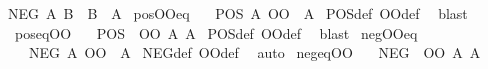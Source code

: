 \begin{isabellebody}
{\isachardoublequoteopen}NEG\ A\ B\ {\isasymequiv}\ B\ {\isasymle}\ A{\isachardoublequoteclose}\isanewline
\isanewline
{}\isamarkupfalse%
\ pos{\isacharunderscore}{\kern0pt}OO{\isacharunderscore}{\kern0pt}eq{\isacharcolon}{\kern0pt}\isanewline
\ \ \ {\isachardoublequoteopen}POS\ {\isacharparenleft}{\kern0pt}A\ OO\ {\isacharparenleft}{\kern0pt}{\isacharequal}{\kern0pt}{\isacharparenright}{\kern0pt}{\isacharparenright}{\kern0pt}\ A{\isachardoublequoteclose}\isanewline
%
\isadelimproof
%
\endisadelimproof
%
\isatagproof
{}\isamarkupfalse%
\ POS{\isacharunderscore}{\kern0pt}def\ OO{\isacharunderscore}{\kern0pt}def\ \isamarkupfalse%
\ blast%
\endisatagproof
{\isafoldproof}%
%
\isadelimproof
\isanewline
%
\endisadelimproof
\isanewline
{}\isamarkupfalse%
\ pos{\isacharunderscore}{\kern0pt}eq{\isacharunderscore}{\kern0pt}OO{\isacharcolon}{\kern0pt}\isanewline
\ \ \ {\isachardoublequoteopen}POS\ {\isacharparenleft}{\kern0pt}{\isacharparenleft}{\kern0pt}{\isacharequal}{\kern0pt}{\isacharparenright}{\kern0pt}\ OO\ A{\isacharparenright}{\kern0pt}\ A{\isachardoublequoteclose}\isanewline
%
\isadelimproof
%
\endisadelimproof
%
\isatagproof
{}\isamarkupfalse%
\ POS{\isacharunderscore}{\kern0pt}def\ OO{\isacharunderscore}{\kern0pt}def\ \isamarkupfalse%
\ blast%
\endisatagproof
{\isafoldproof}%
%
\isadelimproof
\isanewline
%
\endisadelimproof
\isanewline
{}\isamarkupfalse%
\ neg{\isacharunderscore}{\kern0pt}OO{\isacharunderscore}{\kern0pt}eq{\isacharcolon}{\kern0pt}\isanewline
\ \ \ {\isachardoublequoteopen}NEG\ {\isacharparenleft}{\kern0pt}A\ OO\ {\isacharparenleft}{\kern0pt}{\isacharequal}{\kern0pt}{\isacharparenright}{\kern0pt}{\isacharparenright}{\kern0pt}\ A{\isachardoublequoteclose}\isanewline
%
\isadelimproof
%
\endisadelimproof
%
\isatagproof
{}\isamarkupfalse%
\ NEG{\isacharunderscore}{\kern0pt}def\ OO{\isacharunderscore}{\kern0pt}def\ \isamarkupfalse%
\ auto%
\endisatagproof
{\isafoldproof}%
%
\isadelimproof
\isanewline
%
\endisadelimproof
\isanewline
{}\isamarkupfalse%
\ neg{\isacharunderscore}{\kern0pt}eq{\isacharunderscore}{\kern0pt}OO{\isacharcolon}{\kern0pt}\isanewline
\ \ \ {\isachardoublequoteopen}NEG\ {\isacharparenleft}{\kern0pt}{\isacharparenleft}{\kern0pt}{\isacharequal}{\kern0pt}{\isacharparenright}{\kern0pt}\ OO\ A{\isacharparenright}{\kern0pt}\ A{\isachardoublequoteclose}\isanewline
%
\isadelimproof
%
\endisadelimproof

\end{isabellebody}
